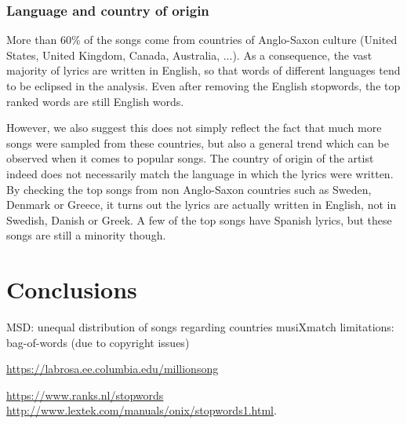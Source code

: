 \documentclass[11pt]{article}
\renewcommand\_{\textunderscore\allowbreak}
\begin{document}
\subsubsection{Language and country of origin}
More than 60\% of the songs come from countries of Anglo-Saxon culture (United States, United Kingdom, Canada, Australia, ...). As a consequence, the vast majority of lyrics are written in English, so that words of different languages tend to be eclipsed in the analysis.
Even after removing the English stopwords, the top ranked words are still English words.

However, we also suggest this does not simply reflect the fact that much more songs were sampled from these countries, but also a general trend which can be observed when it comes to popular songs.
The country of origin of the artist indeed does not necessarily match the language in which the lyrics were written.
By checking the top songs from non Anglo-Saxon countries such as Sweden, Denmark or Greece, it turns out the lyrics are actually written in English, not in Swedish, Danish or Greek.
A few of the top songs have Spanish lyrics, but these songs are still a minority though.




	
\section{Conclusions}

MSD: unequal distribution of songs regarding countries
musiXmatch limitations: bag-of-words (due to copyright issues)





\begin{thebibliography}{}

\url{https://labrosa.ee.columbia.edu/millionsong}

\url{https://www.ranks.nl/stopwords}\\
\url{http://www.lextek.com/manuals/onix/stopwords1.html}.


\end{thebibliography}
\end{document}
